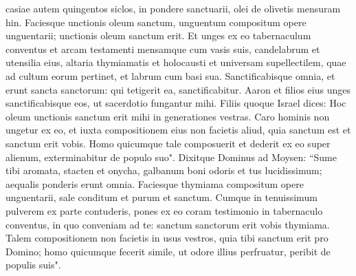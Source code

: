 \begin{biblechapter}
\verse casiae autem quingentos siclos, in pondere sanctuarii, olei de olivetis mensuram hin. 
\verse Faciesque unctionis oleum sanctum, unguentum compositum opere unguentarii; unctionis oleum sanctum erit. 
\verse Et unges ex eo tabernaculum conventus et arcam testamenti 
\verse mensamque cum vasis suis, candelabrum et utensilia eius, altaria thymiamatis 
\verse et holocausti et universam supellectilem, quae ad cultum eorum pertinet, et labrum cum basi sua.  
\verse Sanctificabisque omnia, et erunt sancta sanctorum: qui tetigerit ea, sanctificabitur. 
\verse Aaron et filios eius unges sanctificabisque eos, ut sacerdotio fungantur mihi. 
\verse Filiis quoque Israel dices: Hoc oleum unctionis sanctum erit mihi in generationes vestras. 
\verse Caro hominis non ungetur ex eo, et iuxta compositionem eius non facietis aliud, quia sanctum est et sanctum erit vobis.  
\verse Homo quicumque tale composuerit et dederit ex eo super alienum, exterminabitur de populo suo". 
\verse Dixitque Dominus ad Moysen: “Sume tibi aromata, stacten et onycha, galbanum boni odoris et tus lucidissimum; aequalis ponderis erunt omnia. 
\verse Faciesque thymiama compositum opere unguentarii, sale conditum et purum et sanctum. 
\verse Cumque in tenuissimum pulverem ex parte contuderis, pones ex eo coram testimonio in tabernaculo conventus, in quo conveniam ad te: sanctum sanctorum erit vobis thymiama. 
\verse Talem compositionem non facietis in usus vestros, quia tibi sanctum erit pro Domino; 
\verse homo quicumque fecerit simile, ut odore illius perfruatur, peribit de populis suis". 
\end{biblechapter}

